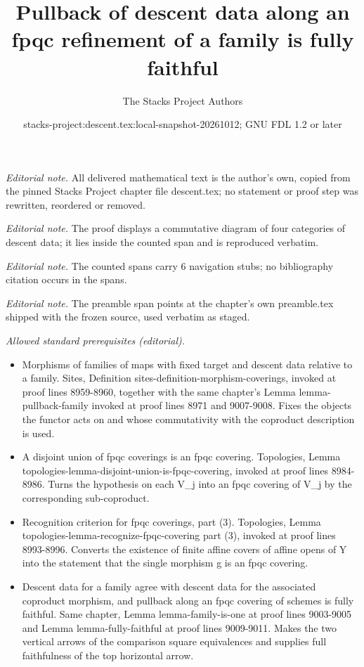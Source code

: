 \documentclass{stacks-project}
\title{Pullback of descent data along an fpqc refinement of a family is fully faithful}
\author{The Stacks Project Authors}
\date{stacks-project:descent.tex:local-snapshot-20261012; GNU FDL 1.2 or later}
\theoremstyle{plain}
\theoremstyle{definition}
\theoremstyle{remark}
\numberwithin{equation}{subsection}
\begin{document}
\maketitle
\noindent\textit{Editorial note.} All delivered mathematical text is the author's own, copied from the pinned Stacks Project chapter file descent.tex; no statement or proof step was rewritten, reordered or removed.\par\medskip
\noindent\textit{Editorial note.} The proof displays a commutative diagram of four categories of descent data; it lies inside the counted span and is reproduced verbatim.\par\medskip
\noindent\textit{Editorial note.} The counted spans carry 6 navigation stubs; no bibliography citation occurs in the spans.\par\medskip
\noindent\textit{Editorial note.} The preamble span points at the chapter's own preamble.tex shipped with the frozen source, used verbatim as staged.\par\medskip
\noindent\textit{Allowed standard prerequisites (editorial).}\begin{itemize}
\item Morphisms of families of maps with fixed target and descent data relative to a family. Sites, Definition sites-definition-morphism-coverings, invoked at proof lines 8959-8960, together with the same chapter's Lemma lemma-pullback-family invoked at proof lines 8971 and 9007-9008. Fixes the objects the functor acts on and whose commutativity with the coproduct description is used.
\item A disjoint union of fpqc coverings is an fpqc covering. Topologies, Lemma topologies-lemma-disjoint-union-is-fpqc-covering, invoked at proof lines 8984-8986. Turns the hypothesis on each V\_j into an fpqc covering of V\_j by the corresponding sub-coproduct.
\item Recognition criterion for fpqc coverings, part (3). Topologies, Lemma topologies-lemma-recognize-fpqc-covering part (3), invoked at proof lines 8993-8996. Converts the existence of finite affine covers of affine opens of Y into the statement that the single morphism g is an fpqc covering.
\item Descent data for a family agree with descent data for the associated coproduct morphism, and pullback along an fpqc covering of schemes is fully faithful. Same chapter, Lemma lemma-family-is-one at proof lines 9003-9005 and Lemma lemma-fully-faithful at proof lines 9009-9011. Makes the two vertical arrows of the comparison square equivalences and supplies full faithfulness of the top horizontal arrow.
\end{itemize}\medskip
\end{document}
